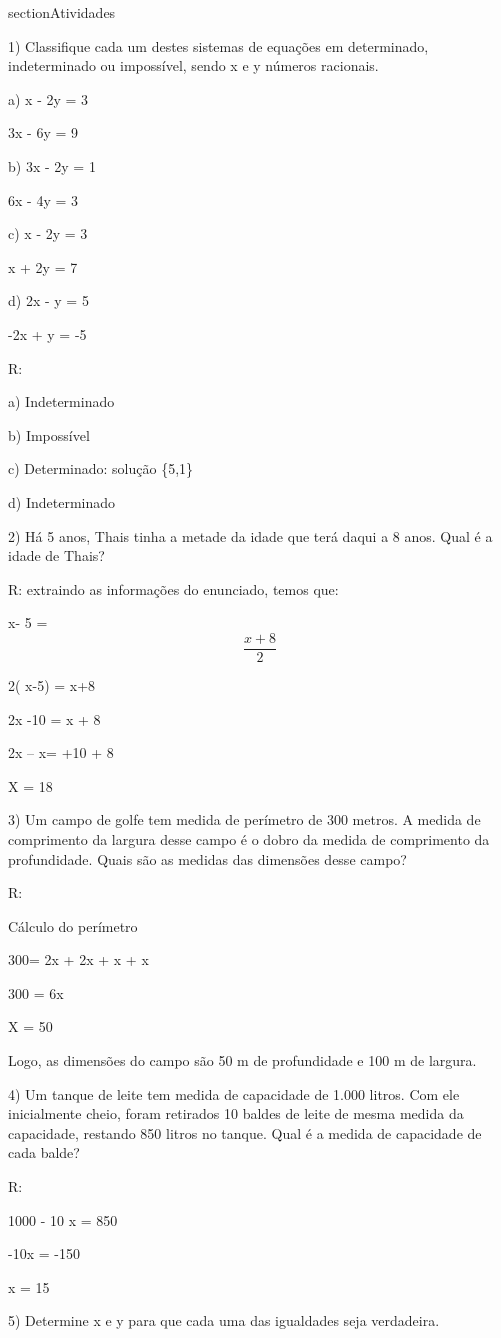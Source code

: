 section{Atividades}

1) Classifique cada um destes sistemas de equações em determinado,
indeterminado ou impossível, sendo x e y números racionais.

a) x - 2y = 3

3x - 6y = 9

b) 3x - 2y = 1

6x - 4y = 3

c) x - 2y = 3

x + 2y = 7

d) 2x - y = 5

-2x + y = -5

R:

a) Indeterminado

b) Impossível

c) Determinado: solução \{5,1\}

d) Indeterminado

2) Há 5 anos, Thais tinha a metade da idade que terá daqui a 8 anos.
Qual é a idade de Thais?

R: extraindo as informações do enunciado, temos que:

x- 5 = \[\frac{x + 8}{2}\]

2( x-5) = x+8

2x -10 = x + 8

2x -- x= +10 + 8

X = 18

3) Um campo de golfe tem medida de perímetro de 300 metros. A medida de
comprimento da largura desse campo é o dobro da medida de comprimento da
profundidade. Quais são as medidas das dimensões desse campo?

R:

Cálculo do perímetro

300= 2x + 2x + x + x

300 = 6x

X = 50

Logo, as dimensões do campo são 50 m de profundidade e 100 m de largura.

4) Um tanque de leite tem medida de capacidade de 1.000 litros. Com ele
inicialmente cheio, foram retirados 10 baldes de leite de mesma medida
da capacidade, restando 850 litros no tanque. Qual é a medida de
capacidade de cada balde?

R:

1000 - 10 x = 850

-10x = -150

x = 15

5) Determine x e y para que cada uma das igualdades seja verdadeira.

